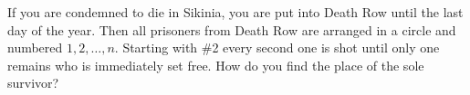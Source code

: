 If you are condemned to die in Sikinia, you are put into Death Row until the last day of the year. Then all prisoners from Death Row are arranged in a circle and numbered $1, 2, \ldots, n$. Starting with \#2 every second one is shot until only one remains who is immediately set free. How do you find the place of the sole survivor?
